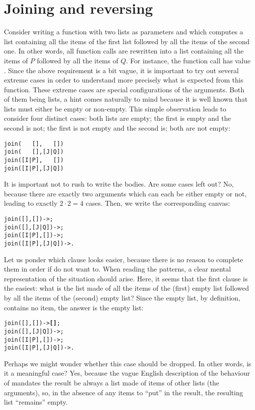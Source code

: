 
\chapter{Joining and reversing}

Consider writing a function  with two lists as
parameters and which computes a list containing all the items of the
first list followed by all the items of the second one. In other
words, all function calls  are rewritten
into a list containing all the items of \(P\) followed by all the
items of \(Q\). For instance, the function call
 has value
. Since the above requirement is a bit vague,
it is important to try out several extreme cases in order to
understand more precisely what is expected from this function. These
extreme cases are special configurations of the arguments. Both of
them being lists, a hint comes naturally to mind because it is well
known that lists must either be empty or non\hyp{}empty. This simple
observation leads to consider four distinct cases: both lists are
empty; the first is empty and the second is not; the first is not
empty and the second is; both are not empty:
\begin{verbatim}
join(   [],   [])
join(   [],[J|Q])
join([I|P],   [])
join([I|P],[J|Q])
\end{verbatim}
It is important not to rush to write the bodies. Are some cases left
out? No, because there are exactly two arguments which can each be
either empty or not, leading to exactly \(2 \cdot 2 = 4\) cases. Then,
we write the corresponding \Erlang canvas:
\begin{alltt}
join(   [],   []) -> \fbcode{[I|join(P,[J|Q])]};
join(   [],[J|Q]) -> \fbcode{[I|join(P,[J|Q])]};
join([I|P],   []) -> \fbcode{[I|join(P,[J|Q])]};
join([I|P],[J|Q]) -> \fbcode{[I|join(P,[J|Q])]}.
\end{alltt}
Let us ponder which clause looks easier, because there is no reason to
complete them in order if do not want to. When reading the patterns, a
clear mental representation of the situation should arise. Here, it
seems that the first clause is the easiest: what is the list made of
all the items of the (first) empty list followed by all the items of
the (second) empty list? Since the empty list, by definition, contains
no item, the answer is the empty list:
\begin{alltt}
join(   [],   []) -> \textbf{[]};
join(   [],[J|Q]) -> \fbcode{[I|join(P,[J|Q])]};
join([I|P],   []) -> \fbcode{[I|join(P,[J|Q])]};
join([I|P],[J|Q]) -> \fbcode{[I|join(P,[J|Q])]}.
\end{alltt}
Perhaps we might wonder whether this case should be dropped. In other
words, is it a meaningful case? Yes, because the vague English
description of the behaviour of  mandates the result
be always a list made of items of other lists (the arguments), so, in
the absence of any items to ``put'' in the result, the resulting list
``remains'' empty.

